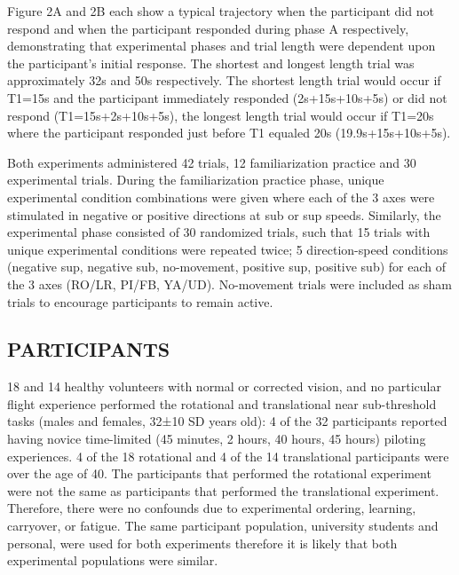 \documentclass[11pt, onecolumn]{article}
\begin{document}
Figure 2A and 2B each show a typical trajectory when the participant did not respond and when the participant responded during phase A respectively, demonstrating that experimental phases and trial length were dependent upon the participant’s initial response.  The shortest and longest length trial was approximately 32s and 50s respectively.  The shortest length trial would occur if T1=15s and the participant immediately responded (2s+15s+10s+5s) or did not respond  (T1=15s+2s+10s+5s), the longest length trial would occur if T1=20s where the participant responded just before T1 equaled 20s (19.9s+15s+10s+5s).

Both experiments administered 42 trials, 12 familiarization practice and 30 experimental trials.  During the familiarization practice phase, unique experimental condition combinations were given where each of the 3 axes were stimulated in negative or positive directions at sub or sup speeds.  Similarly, the experimental phase consisted of 30 randomized trials, such that 15 trials with unique experimental conditions were repeated twice; 5 direction-speed conditions (negative sup, negative sub, no-movement, positive sup, positive sub) for each of the 3 axes (RO/LR, PI/FB, YA/UD).  No-movement trials were included as sham trials to encourage participants to remain active.

\subsection{PARTICIPANTS}
18 and 14 healthy volunteers with normal or corrected vision, and no particular flight experience performed the rotational and translational near sub-threshold tasks (males and females, 32±10 SD years old): 4 of the 32 participants reported having novice time-limited (45 minutes, 2 hours, 40 hours, 45 hours) piloting experiences. 4 of the 18 rotational and 4 of the 14 translational participants were over the age of 40. The participants that performed the rotational experiment were not the same as participants that performed the translational experiment. Therefore, there were no confounds due to experimental ordering, learning, carryover, or fatigue. The same participant population, university students and personal, were used for both experiments therefore it is likely that both experimental populations were similar.
\end{document}
